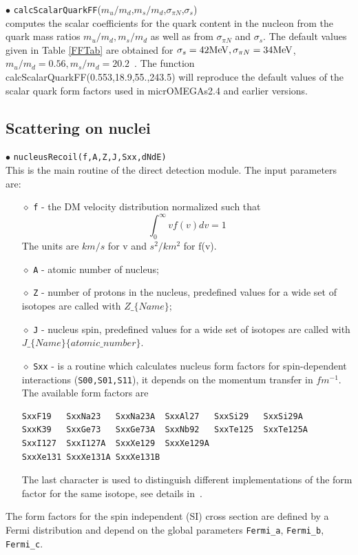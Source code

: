 \documentclass[12pt,a4paper]{article}
\begin{document}
\noindent$\bullet$
{\tt calcScalarQuarkFF}($m_u/m_d$,$m_s/m_d$,$\sigma_{\pi N}$,$\sigma_s$)\\
computes the scalar coefficients for the quark content in the nucleon from the quark mass ratios
$m_u/m_d, m_s/m_d$ as well as from $\sigma_{\pi N}$ and $\sigma_s$.
The default values given in Table  \ref{FFTab} are obtained for 
$\sigma_s=42{\rm MeV},\sigma_{\pi N}=34{\rm MeV}$, $m_u/m_d=0.56, m_s/m_d=20.2$~\cite{Beringer:1900zz}.
The function calcScalarQuarkFF(0.553,18.9,55.,243.5)  will reproduce   the default values of the  scalar quark
form factors used in micrOMEGAs2.4 and earlier  versions.




\subsection{Scattering on nuclei}
\label{DDforNucleus}
$\bullet$ \verb|nucleusRecoil(f,A,Z,J,Sxx,dNdE)|\\
This is the main routine of the  direct detection module. The
input parameters are:
\begin{itemize}
\item[$\diamond$]
\verb|f| -  the DM velocity distribution   normalized such that 
$$ \int_0^{\infty} v f(v) dv =1$$ 
The units  are $km/s$ for v and $s^2/km^2$ for  f(v).
\item[$\diamond$]
\verb|A| - atomic number of nucleus;
\item[$\diamond$]
\verb|Z| - number of protons in the nucleus, predefined values for a wide set of isotopes 
are called with $Z\_\{Name\}$;
\item[$\diamond$]
\verb|J| - nucleus spin,  predefined values for a wide set of isotopes
are called with\\
 $J\_\{Name\}\{atomic\_number\}$.
\item[$\diamond$]
\verb|Sxx| - is a routine which calculates nucleus form factors for
spin-dependent interactions (\verb|S00,S01,S11|), it depends  on the momentum
transfer in $fm^{-1}$. The available form factors are
\begin{verbatim}
SxxF19   SxxNa23   SxxNa23A  SxxAl27   SxxSi29   SxxSi29A  
SxxK39   SxxGe73   SxxGe73A  SxxNb92   SxxTe125  SxxTe125A 
SxxI127  SxxI127A  SxxXe129  SxxXe129A 
SxxXe131 SxxXe131A SxxXe131B
\end{verbatim}
The last character 
is used to distinguish different implementations of
the form factor for the same isotope, see details in~\cite{Belanger:2008sj}.
\end{itemize}
The form factors for the spin independent (SI) cross section are defined by a Fermi distribution
and depend on the global parameters \verb|Fermi_a|, \verb|Fermi_b|,
\verb|Fermi_c|. 
\end{document}
